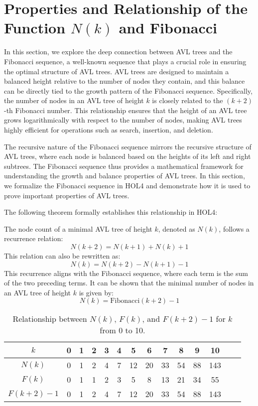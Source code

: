 \chapter{Properties and Relationship of the Function \texorpdfstring{$N(k)$}{N(k)} and Fibonacci }\label{chap:content}


In this section, we explore the deep connection between AVL trees and the Fibonacci sequence, a well-known sequence that plays a crucial role in ensuring the optimal structure of AVL trees. AVL trees are designed to maintain a balanced height relative to the number of nodes they contain, and this balance can be directly tied to the growth pattern of the Fibonacci sequence. Specifically, the number of nodes in an AVL tree of height \( k \) is closely related to the \( (k+2) \)-th Fibonacci number. This relationship ensures that the height of an AVL tree grows logarithmically with respect to the number of nodes, making AVL trees highly efficient for operations such as search, insertion, and deletion.

The recursive nature of the Fibonacci sequence mirrors the recursive structure of AVL trees, where each node is balanced based on the heights of its left and right subtrees. The Fibonacci sequence thus provides a mathematical framework for understanding the growth and balance properties of AVL trees. In this section, we formalize the Fibonacci sequence in HOL4 and demonstrate how it is used to prove important properties of AVL trees.

The following theorem formally establishes this relationship in HOL4:

	The node count of a minimal AVL tree of height $k$, denoted as $N(k)$, follows a recurrence relation:
	\[
	N(k+2) = N(k+1) + N(k) + 1
	\]
	This relation can also be rewritten as:
	\[
	N(k) = N(k+2) - N(k+1) - 1
	\]
	This recurrence aligns with the Fibonacci sequence, where each term is the sum of the two preceding terms. It can be shown that the minimal number of nodes in an AVL tree of height $k$ is given by:
	\[
	N(k) = \text{Fibonacci}(k+2) - 1
	\]


\begin{table}
	\centering
	\begin{tabular}{cccccccccccccc}
		\toprule
		\textbf{$k$}          & 0   & 1   & 2   & 3   & 4   & 5    & 6    & 7    & 8    & 9    & 10     \\ \midrule
		\textbf{$N(k)$}       & 0   & 1   & 2   & 4   & 7   & 12   & 20   & 33   & 54   & 88   & 143   \\ \midrule
		\textbf{$F(k)$}       & 0   & 1   & 1   & 2   & 3   & 5    & 8    & 13   & 21   & 34   & 55    \\ \midrule
		\textbf{$F(k+2) - 1$} & 0   & 1   & 2   & 4   & 7   & 12   & 20   & 33   & 54   & 88   & 143  \\ 
		\bottomrule
	\end{tabular}
	\caption{Relationship between $N(k)$, $F(k)$, and $F(k+2) - 1$ for $k$ from 0 to 10.}
\end{table}

